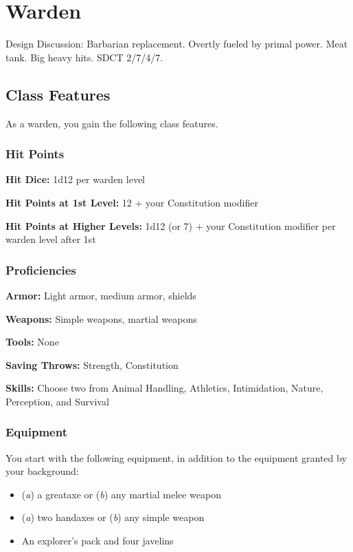 \section{Warden\label{class:warden}}

Design Discussion: Barbarian replacement. Overtly fueled by primal power. Meat tank. Big heavy hits. SDCT 2/7/4/7.

\subsection{Class Features}

As a warden, you gain the following class features.

\subsubsection{Hit Points}

\textbf{Hit Dice:} 1d12 per warden level

\textbf{Hit Points at 1st Level:} 12 + your Constitution modifier

\textbf{Hit Points at Higher Levels:} 1d12 (or 7) + your Constitution modifier per warden level after 1st

\subsubsection{Proficiencies}

\textbf{Armor:} Light armor, medium armor, shields

\textbf{Weapons:} Simple weapons, martial weapons

\textbf{Tools:} None

\textbf{Saving Throws:} Strength, Constitution

\textbf{Skills:} Choose two from Animal Handling, Athletics, Intimidation, Nature, Perception, and Survival

\subsubsection{Equipment}

You start with the following equipment, in addition to the equipment granted by your background:

\begin{itemize}
\item  (\textit{a}) a greataxe or (\textit{b}) any martial melee weapon
\item  (\textit{a}) two handaxes or (\textit{b}) any simple weapon
\item  An explorer’s pack and four javelins
\end{itemize}

